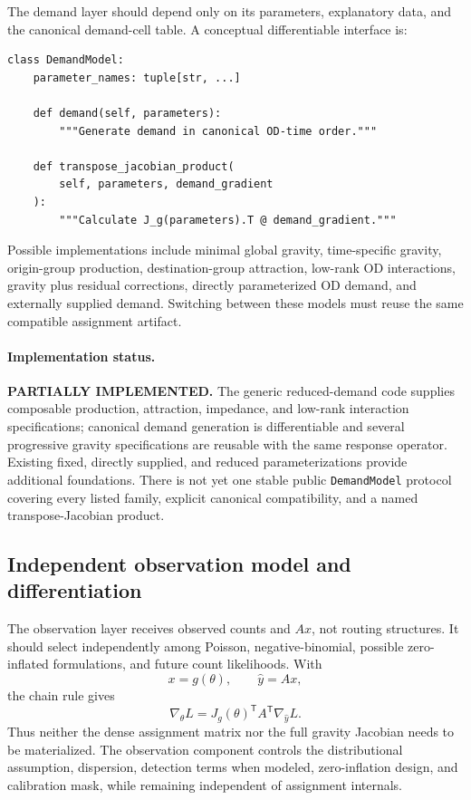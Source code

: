 The demand layer should depend only on its parameters, explanatory data, and
the canonical demand-cell table.  A conceptual differentiable interface is:
\begin{verbatim}
class DemandModel:
    parameter_names: tuple[str, ...]

    def demand(self, parameters):
        """Generate demand in canonical OD-time order."""

    def transpose_jacobian_product(
        self, parameters, demand_gradient
    ):
        """Calculate J_g(parameters).T @ demand_gradient."""
\end{verbatim}
Possible implementations include minimal global gravity, time-specific
gravity, origin-group production, destination-group attraction, low-rank OD
interactions, gravity plus residual corrections, directly parameterized OD
demand, and externally supplied demand.  Switching between these models must
reuse the same compatible assignment artifact.

\paragraph{Implementation status.}
\textbf{PARTIALLY IMPLEMENTED.}  The generic reduced-demand code supplies
composable production, attraction, impedance, and low-rank interaction
specifications; canonical demand generation is differentiable and several
progressive gravity specifications are reusable with the same response
operator.  Existing fixed, directly supplied, and reduced parameterizations
provide additional foundations.  There is not yet one stable public
\texttt{DemandModel} protocol covering every listed family, explicit canonical
compatibility, and a named transpose-Jacobian product.

\subsection{Independent observation model and differentiation}

The observation layer receives observed counts and $Ax$, not routing
structures.  It should select independently among Poisson, negative-binomial,
possible zero-inflated formulations, and future count likelihoods.  With
\begin{equation}
  x=g(\theta),
  \qquad
  \widehat y=Ax,
\end{equation}
the chain rule gives
\begin{equation}
  \nabla_\theta L
  =J_g(\theta)^{\mathsf T}
   A^{\mathsf T}
   \nabla_{\widehat y}L.
  \label{eq:layered-adjoint-gradient}
\end{equation}
Thus neither the dense assignment matrix nor the full gravity Jacobian needs
to be materialized.  The observation component controls the distributional
assumption, dispersion, detection terms when modeled, zero-inflation design,
and calibration mask, while remaining independent of assignment internals.

